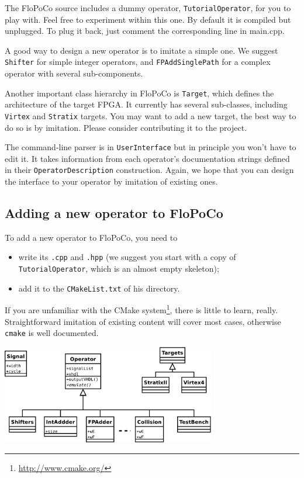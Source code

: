 \documentclass{article}
\begin{document}
The FloPoCo source includes a dummy operator, \texttt{TutorialOperator}, for you to play with. 
Feel free to experiment within this one. 
By default it is compiled but unplugged. To plug it back, just comment the corresponding line in main.cpp.

A good way to design a new operator is to imitate a simple one. We suggest \texttt{Shifter} for simple integer operators, and \texttt{FPAddSinglePath} for a complex operator with several sub-components.

Another important class hierarchy in FloPoCo is \texttt{Target}, which
defines the architecture of the target FPGA. It currently has several sub-classes,
including \texttt{Virtex} and \texttt{Stratix} targets. You may want to
add a new target, the best way to do so is by imitation. Please
consider contributing it to the project.

The command-line parser is in \texttt{UserInterface} but in principle you won't have to edit it.
It takes information from each operator's documentation strings defined in their \texttt{OperatorDescription} construction. 
Again, we hope that you can design the interface to your operator by imitation of existing ones.

\subsection{Adding a new operator to FloPoCo}
To add a new operator to FloPoCo, you need to 
\begin{itemize}
\item write its \texttt{.cpp} and \texttt{.hpp} (we suggest you start with a copy of  \texttt{TutorialOperator}, which is an almost empty skeleton);
\item add it to the \texttt{CMakeList.txt} of his directory.
\end{itemize}
If you are unfamiliar with the CMake system\footnote{\url{http://www.cmake.org/}}, there is little to learn, really.
Straightforward imitation of existing content  will cover most cases, otherwise \texttt{cmake} is well documented.



\begin{center}
  \includegraphics[width=0.7\textwidth]{../Figures/FloPoCoClasses.pdf}        
\end{center}
\end{document}
